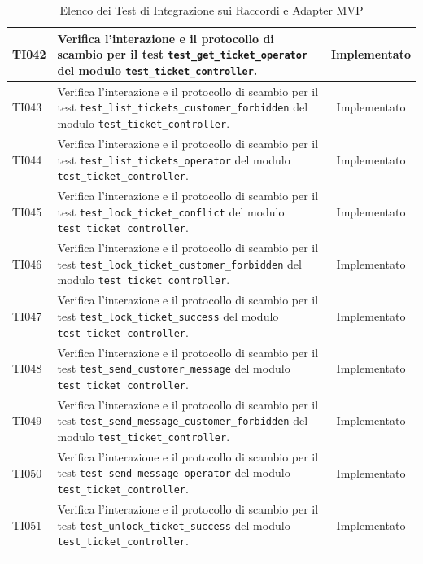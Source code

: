 \documentclass[a4paper,11pt,oneside]{scrartcl}
\begin{document}
\begin{longtable}{|p{1.9cm}|p{11.6cm}|c|}
    TI042 & Verifica l'interazione e il protocollo di scambio per il test \texttt{test\_get\_ticket\_operator} del modulo \texttt{test\_ticket\_controller}. & Implementato \\ \hline
    TI043 & Verifica l'interazione e il protocollo di scambio per il test \texttt{test\_list\_tickets\_customer\_forbidden} del modulo \texttt{test\_ticket\_controller}. & Implementato \\ \hline
    TI044 & Verifica l'interazione e il protocollo di scambio per il test \texttt{test\_list\_tickets\_operator} del modulo \texttt{test\_ticket\_controller}. & Implementato \\ \hline
    TI045 & Verifica l'interazione e il protocollo di scambio per il test \texttt{test\_lock\_ticket\_conflict} del modulo \texttt{test\_ticket\_controller}. & Implementato \\ \hline
    TI046 & Verifica l'interazione e il protocollo di scambio per il test \texttt{test\_lock\_ticket\_customer\_forbidden} del modulo \texttt{test\_ticket\_controller}. & Implementato \\ \hline
    TI047 & Verifica l'interazione e il protocollo di scambio per il test \texttt{test\_lock\_ticket\_success} del modulo \texttt{test\_ticket\_controller}. & Implementato \\ \hline
    TI048 & Verifica l'interazione e il protocollo di scambio per il test \texttt{test\_send\_customer\_message} del modulo \texttt{test\_ticket\_controller}. & Implementato \\ \hline
    TI049 & Verifica l'interazione e il protocollo di scambio per il test \texttt{test\_send\_message\_customer\_forbidden} del modulo \texttt{test\_ticket\_controller}. & Implementato \\ \hline
    TI050 & Verifica l'interazione e il protocollo di scambio per il test \texttt{test\_send\_message\_operator} del modulo \texttt{test\_ticket\_controller}. & Implementato \\ \hline
    TI051 & Verifica l'interazione e il protocollo di scambio per il test \texttt{test\_unlock\_ticket\_success} del modulo \texttt{test\_ticket\_controller}. & Implementato \\ \hline
    \caption{Elenco dei Test di Integrazione sui Raccordi e Adapter MVP}
\end{longtable}
\end{document}
